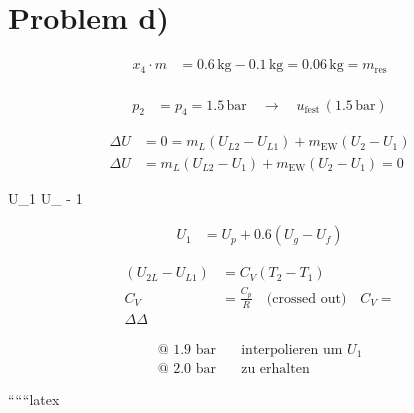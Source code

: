 \section*{Problem d)}

\begin{align*}
    x_4 \cdot m &= 0.6 \, \text{kg} - 0.1 \, \text{kg} = 0.06 \, \text{kg} = m_{\text{res}} \\
\end{align*}


\begin{align*}
    p_2 &= p_4 = 1.5 \, \text{bar} \quad \rightarrow \quad u_{\text{fest}} \, (1.5 \, \text{bar})
\end{align*}


\begin{align*}
    \Delta U &= 0 = m_L (U_{L2} - U_{L1}) + m_{\text{EW}} (U_2 - U_1) \\
    \Delta U &= m_L (U_{L2} - U_1) + m_{\text{EW}} (U_2 - U_1) = 0
\end{align*}

 U_1  U_{ - 1}

\begin{align*}
    U_1 &= U_p + 0.6 (U_g - U_f)
\end{align*}



\begin{align*}
    (U_{2L} - U_{L1}) &= C_V (T_2 - T_1) \\
    C_V &= \frac{C_p}{R} \quad \text{(crossed out)} \quad C_V = \\
    \Delta \Delta
\end{align*}

\begin{align*}
    \text{@ 1.9 bar} &\quad \text{interpolieren um } U_1 \\
    \text{@ 2.0 bar} &\quad \text{zu erhalten}
\end{align*}

``````latex